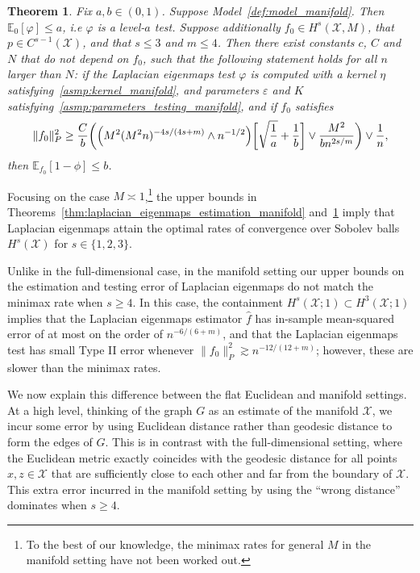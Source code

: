 \documentclass[aos]{imsart}
\theoremstyle{plain}
\newtheorem{theorem}{Theorem}
\theoremstyle{definition}
\theoremstyle{remark}
\newcommand{\Ebb}{\mathbb{E}}
\newcommand{\wh}[1]{\widehat{#1}}
\newcommand{\mc}[1]{\mathcal{#1}}
\newcommand{\1}{\mathbf{1}}
\begin{document}
\begin{theorem}
	\label{thm:laplacian_eigenmaps_testing_manifold}
	Fix $a,b \in (0,1)$. Suppose Model~\ref{def:model_manifold}. Then $\mathbb{E}_0[\varphi] \leq a$, i.e $\varphi$ is a level-$a$ test. Suppose additionally $f_0 \in H^s(\mc{X},M)$, that $p \in C^{s-1}(\mc{X})$, and that $s \leq 3$ and $m \leq 4$. Then there exist constants $c$, $C$ and $N$ that do not depend on $f_0$, such that the following statement holds for all $n$ larger than $N$: if the Laplacian eigenmaps test $\varphi$ is computed with a kernel $\eta$ satisfying~\ref{asmp:kernel_manifold}, and parameters $\varepsilon$ and $K$ satisfying~\ref{asmp:parameters_testing_manifold}, and if $f_0$ satisfies
	\begin{equation}
	\label{eqn:laplacian_eigenmaps_testing_criticalradius_manifold}
	\|f_0\|_P^2 \geq \frac{C}{b}\biggl(\Bigl(M^2(M^2n)^{-4s/(4s + m) } \wedge n^{-1/2}\Bigr)\biggl[\sqrt{\frac{1}{a}} + \frac{1}{b}\biggr] \vee \frac{M^2}{b n^{2s/m}} \biggr) \vee \frac{1}{n},
	\end{equation}
	then $\Ebb_{f_0}[1 - \phi] \leq b$.
\end{theorem}
Focusing on the case $M \asymp 1$,\footnote{To the best of our knowledge, the minimax rates for general $M$ in the manifold setting have not been worked out.} the upper bounds in Theorems~\ref{thm:laplacian_eigenmaps_estimation_manifold} and~\ref{thm:laplacian_eigenmaps_testing_manifold} imply that Laplacian eigenmaps attain the optimal rates of convergence over Sobolev balls $H^s(\mc{X})$ for $s \in \{1,2,3\}$. 

Unlike in the full-dimensional case, in the manifold setting our upper bounds on the estimation and testing error of Laplacian eigenmaps do not match the minimax rate when $s \geq 4$.  In this case, the containment $H^s(\mc{X};1) \subset H^{3}(\mc{X};1)$ implies that the Laplacian eigenmaps estimator $\wh{f}$ has in-sample mean-squared error of at most on the order of $n^{-6/(6 + m)}$, and that the Laplacian eigenmaps test has small Type II error whenever $\|f_0\|_P^2 \gtrsim n^{-12/(12 + m)}$; however, these are slower than the minimax rates. 

We now explain this difference between the flat Euclidean and manifold settings. At a high level, thinking of the graph $G$ as an estimate of the manifold $\mc{X}$, we incur some error by using Euclidean distance rather than geodesic distance to form the edges of $G$. This is in contrast with the full-dimensional setting, where the Euclidean metric exactly coincides with the geodesic distance for all points $x,z \in \mc{X}$ that are sufficiently close to each other and far from the boundary of $\mc{X}$. This extra error incurred in the manifold setting by using the ``wrong distance'' dominates when $s \geq 4$. 
\end{document}
